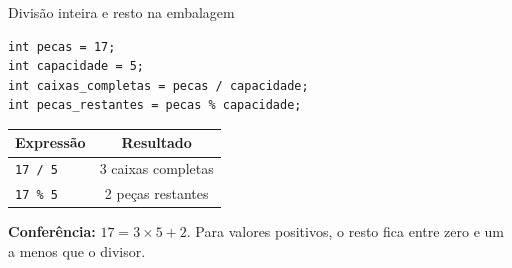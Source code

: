 \begin{frame}[fragile]{Divisão inteira e resto na embalagem}
\begin{lstlisting}
int pecas = 17;
int capacidade = 5;
int caixas_completas = pecas / capacidade;
int pecas_restantes = pecas % capacidade;
\end{lstlisting}
\begin{center}
\begin{tabular}{lc}
\toprule
Expressão & Resultado \\
\midrule
\texttt{17 / 5} & 3 caixas completas \\
\texttt{17 \% 5} & 2 peças restantes \\
\bottomrule
\end{tabular}
\end{center}
\textbf{Conferência:} $17 = 3 \times 5 + 2$. Para valores positivos, o resto fica entre zero e um a menos que o divisor.
\end{frame}
